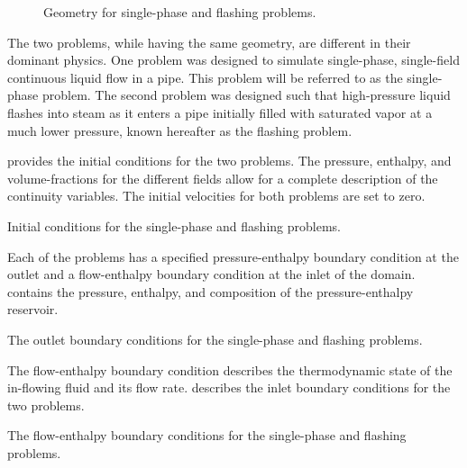 \begin{figure}[h!tb]
\centering

\caption{Geometry for single-phase and flashing problems.}
\label{fig:exp_geometry}
\end{figure}

The two problems, while having the same geometry, are different in their dominant physics.
One problem was designed to simulate single-phase, single-field continuous liquid flow in a pipe.
This problem will be referred to as the single-phase problem.
The second problem was designed such that high-pressure liquid flashes into steam as it enters a pipe initially filled with saturated vapor at a much lower pressure, known hereafter as the flashing problem.

 provides the initial conditions for the two problems.
The pressure, enthalpy, and volume-fractions for the different fields allow for a complete description of the continuity variables.
The initial velocities for both problems are set to zero.

\begin{table}[h!tb]
\centering
\singlespace

\caption{Initial conditions for the single-phase and flashing problems.}
\label{tab:dualInitialConditions}
\end{table}

Each of the problems has a specified pressure-enthalpy boundary condition at the outlet and a flow-enthalpy boundary condition at the inlet of the domain.
 contains the pressure, enthalpy, and composition of the pressure-enthalpy reservoir. 

\begin{table}[h!tb]
\centering
\singlespace

\caption{The outlet boundary conditions for the single-phase and flashing problems.}
\label{tab:dualOutlet}
\end{table}

The flow-enthalpy boundary condition describes the thermodynamic state of the in-flowing fluid and its flow rate.
 describes the inlet boundary conditions for the two problems.

\begin{table}[h!tb]
\centering
\singlespace

\caption{The flow-enthalpy boundary conditions for the single-phase and flashing problems.}
\label{tab:dualInlet}
\end{table}

